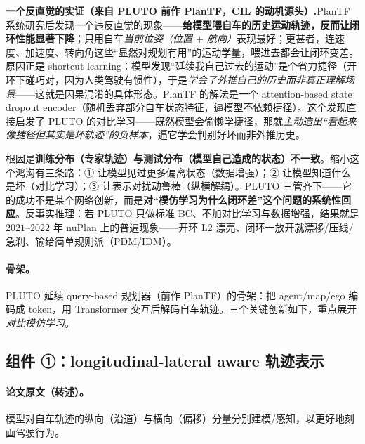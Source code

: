 \begin{note}
\textbf{一个反直觉的实证（来自 PLUTO 前作 PlanTF，CIL 的动机源头）.}\;PlanTF 系统研究后发现一个违反直觉的现象——\textbf{给模型喂自车的历史运动轨迹，反而让闭环性能显著下降}；只用自车\emph{当前位姿（位置 $+$ 航向）}表现最好；更甚者，连速度、加速度、转向角这些“显然对规划有用”的运动学量，喂进去都会让闭环变差。原因正是 shortcut learning：模型发现“延续我自己过去的运动”是个省力捷径（开环下碰巧对，因为人类驾驶有惯性），于是\emph{学会了外推自己的历史而非真正理解场景}——这就是因果混淆的具体形态。PlanTF 的解法是一个 attention-based state dropout encoder（随机丢弃部分自车状态特征，逼模型不依赖捷径）。这个发现直接启发了 PLUTO 的对比学习——既然模型会偷懒学捷径，那就\emph{主动造出“看起来像捷径但其实是坏轨迹”的负样本}，逼它学会判别好坏而非外推历史。
\end{note}

\begin{insight}
根因是\textbf{训练分布（专家轨迹）与测试分布（模型自己造成的状态）不一致}。缩小这个鸿沟有三条路：① 让模型见过更多偏离状态（数据增强）；② 让模型知道什么是坏（对比学习）；③ 让表示对扰动鲁棒（纵横解耦）。PLUTO 三管齐下——它的成功不是某个网络创新，而是\textbf{对“模仿学习为什么闭环差”这个问题的系统性回应}。反事实推理：若 PLUTO 只做标准 BC、不加对比学习与数据增强，结果就是 $2021$--$2022$ 年 nuPlan 上的普遍现象——开环 L2 漂亮、闭环一放开就漂移/压线/急刹、输给简单规则派（PDM/IDM）。
\end{insight}

\paragraph{骨架。}
PLUTO 延续 query-based 规划器（前作 PlanTF）的骨架：把 agent/map/ego 编码成 token，用 Transformer 交互后解码自车轨迹。三个关键创新如下，重点展开\emph{对比模仿学习}。

\subsection{组件 ①：longitudinal-lateral aware 轨迹表示}
\label{sec:de-lonlat}

\paragraph{论文原文（转述）。}
模型对自车轨迹的纵向（沿道）与横向（偏移）分量分别建模/感知，以更好地刻画驾驶行为\cite{cheng2024pluto}。

